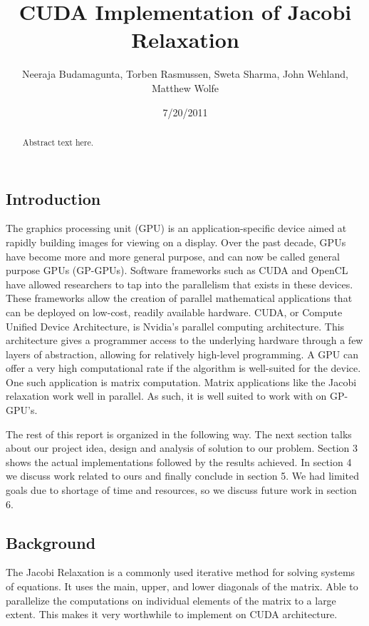 \documentclass[10pt]{article}
\title{CUDA Implementation of Jacobi Relaxation}
\author{Neeraja Budamagunta, Torben Rasmussen, Sweta Sharma, John Wehland, Matthew Wolfe}
\date{7/20/2011}
\renewcommand\theFancyVerbLine{\small\arabic{FancyVerbLine}}
\begin{document}
\renewcommand{\theFancyVerbLine}{
  \sffamily\textcolor[rgb]{0.5,0.5,0.5}{\scriptsize\arabic{FancyVerbLine}}}

\maketitle


\begin{multicols}{2}
\begin{abstract}
Abstract text here.
\end{abstract}
\section{Introduction} %
The graphics processing unit (GPU) is an application-specific device aimed at rapidly building images for viewing on a display.
Over the past decade, GPUs have become more and more general purpose, and can now be called general purpose GPUs (GP-GPUs).
Software frameworks such as CUDA and OpenCL have allowed researchers to tap into the parallelism that exists in these devices.
These frameworks allow the creation of parallel mathematical applications that can be deployed on low-cost, readily available hardware.
CUDA, or Compute Unified Device Architecture, is Nvidia's parallel computing architecture.
This architecture gives a programmer access to the underlying hardware through a few layers of abstraction, allowing for relatively high-level programming.
A GPU can offer a very high computational rate if the algorithm is well-suited for the device.
One such application is matrix computation.
Matrix applications like the Jacobi relaxation work well in parallel.
As such, it is well suited to work with on GP-GPU’s.

The rest of this report is organized in the following way.
The next section talks about our project idea, design and analysis of solution to our problem.
Section 3 shows the actual implementations followed by the results achieved.
In section 4 we discuss work related to ours and finally conclude in section 5.
We had limited goals due to shortage of time and resources, so we discuss future work in section 6.

    \subsection{Background} %
    The Jacobi Relaxation is a commonly used iterative method for solving systems of equations.
    It uses the main, upper, and lower diagonals of the matrix.
    Able to parallelize the computations on individual elements of the matrix to a large extent.
    This makes it very worthwhile to implement on CUDA architecture.


\end{multicols}
\end{document}
